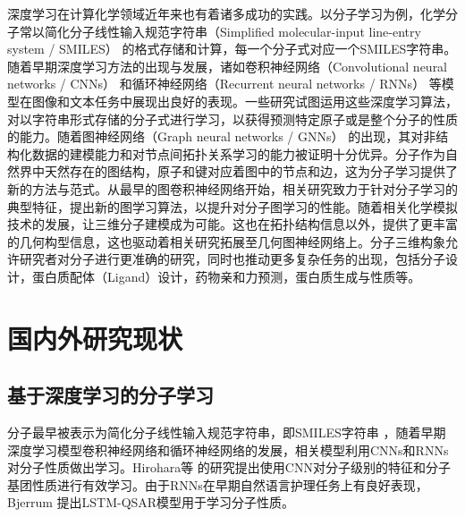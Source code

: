 深度学习在计算化学领域近年来也有着诸多成功的实践。以分子学习为例，化学分子常以简化分子线性输入规范字符串（Simplified molecular-input line-entry system / SMILES） \cite{smiles_weinberger_88}的格式存储和计算，每一个分子式对应一个SMILES字符串。随着早期深度学习方法的出现与发展，诸如卷积神经网络（Convolutional neural networks / CNNs） \cite{cnnsmiles_hirohara_18}和循环神经网络（Recurrent neural networks / RNNs） \cite{rnnsmiles_bjerrum_17,practicalmodel_liu_19,deeppurpose_huang_20}等模型在图像和文本任务中展现出良好的表现。一些研究试图运用这些深度学习算法，对以字符串形式存储的分子式进行学习，以获得预测特定原子或是整个分子的性质的能力。随着图神经网络（Graph neural networks / GNNs） \cite{semisupervised_kipf_17,inductive_hamilton_17,howpowerful_xu_18}的出现，其对非结构化数据的建模能力和对节点间拓扑关系学习的能力被证明十分优异。分子作为自然界中天然存在的图结构，原子和键对应着图中的节点和边，这为分子学习提供了新的方法与范式。从最早的图卷积神经网络开始，相关研究致力于针对分子学习的典型特征，提出新的图学习算法，以提升对分子图学习的性能。随着相关化学模拟技术的发展，让三维分子建模成为可能。这也在拓扑结构信息以外，提供了更丰富的几何构型信息，这也驱动着相关研究拓展至几何图神经网络上。分子三维构象允许研究者对分子进行更准确的研究，同时也推动更多复杂任务的出现，包括分子设计，蛋白质配体（Ligand）设计，药物亲和力预测，蛋白质生成与性质等。

\section{国内外研究现状}
\subsection{基于深度学习的分子学习}
分子最早被表示为简化分子线性输入规范字符串，即SMILES字符串  \cite{smiles_weinberger_88}，随着早期深度学习模型卷积神经网络和循环神经网络的发展，相关模型利用CNNs和RNNs对分子性质做出学习。Hirohara等 \cite{cnnsmiles_hirohara_18}的研究提出使用CNN对分子级别的特征和分子基团性质进行有效学习。由于RNNs在早期自然语言护理任务上有良好表现，Bjerrum \cite{rnnsmiles_bjerrum_17}提出LSTM-QSAR模型用于学习分子性质。

